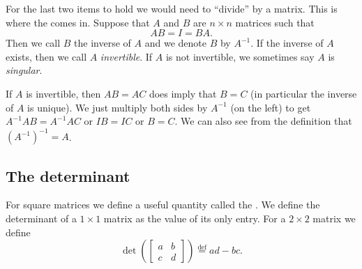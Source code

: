 \documentclass{ximera}
\begin{document}
For the last two items to hold we would need to ``divide'' by a matrix.  This is where the \emph{} comes in. Suppose that $A$ and $B$ are $n \times n$ matrices such that
\begin{equation*}
    AB = I = BA .
\end{equation*}
Then we call $B$ the inverse of $A$ and we denote $B$ by $A^{-1}$. If the inverse of $A$ exists, then we call $A$ \emph{invertible}. If $A$ is not invertible, we sometimes say $A$ is \emph{singular}.

If $A$ is invertible, then $AB = AC$ does imply that $B = C$ (in particular the inverse of $A$ is unique). We just multiply both sides by $A^{-1}$ (on the left) to get $A^{-1}AB = A^{-1}AC$ or $IB=IC$ or $B=C$. We can also see from the definition that ${(A^{-1})}^{-1} = A$.

\subsection{The determinant}

For square matrices we define a useful quantity called the \emph{}.  We define the determinant of a $1 \times 1$ matrix as the value of its only entry. For a $2 \times 2$ matrix we define 
\begin{equation*}
    \det \left(
    \begin{bmatrix}
        a & b \\
        c & d
    \end{bmatrix}
    \right) \overset{\text{def}}{=} ad-bc .
\end{equation*}
\end{document}

